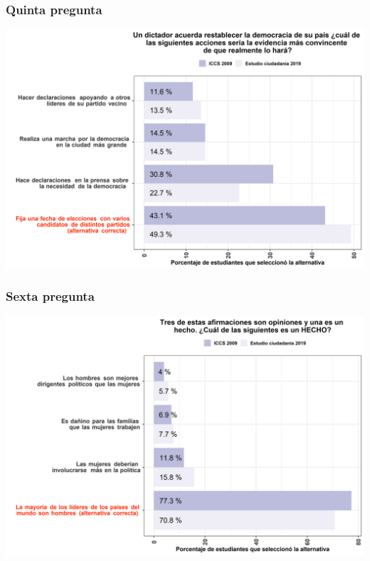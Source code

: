 \documentclass[
  14pt,
]{book}
\begin{document}
\hypertarget{quinta-pregunta-1}{%
\subsubsection{Quinta pregunta}\label{quinta-pregunta-1}}

\begin{center}\includegraphics[width=52.49in]{images/graph_p5} \end{center}

\hypertarget{sexta-pregunta-1}{%
\subsubsection{Sexta pregunta}\label{sexta-pregunta-1}}

\begin{center}\includegraphics[width=52.49in]{images/graph_p6} \end{center}
\end{document}
